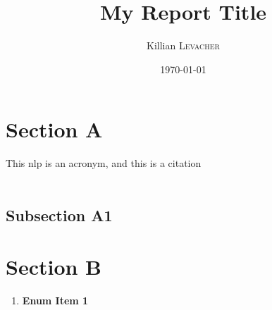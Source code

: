 \documentclass{article}
\title{My Report Title} %
\author{Killian \textsc{Levacher}} %
\date{\today} %
\begin{document}
\maketitle %



\section{Section A}
\label{sectionLabel}

This \gls{nlp} is an acronym, and this \cite{Derczynski2015} is a citation \\ \\
\lipsum[1-2] 

\subsection{Subsection A1}
\lipsum[1-1] 

\section{Section B}



\begin{enumerate}[label=\bfseries \arabic*:]
  \item \textbf{Enum Item 1} \lipsum*[1-1] 

\end{enumerate}

 

\printbibliography

\end{document}
